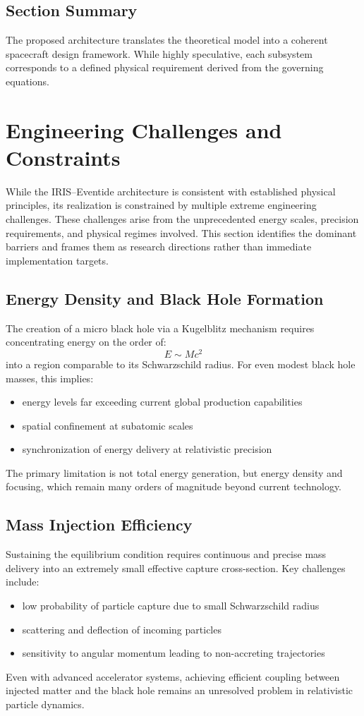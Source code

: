 \documentclass[conference]{IEEEtran}
\begin{document}
\subsection{Section Summary}
The proposed architecture translates the theoretical model into a coherent spacecraft design framework. While highly speculative, each subsystem corresponds to a defined physical requirement derived from the governing equations.
\section{Engineering Challenges and Constraints}
While the IRIS–Eventide architecture is consistent with established physical principles, its realization is constrained by multiple extreme engineering challenges. These challenges arise from the unprecedented energy scales, precision requirements, and physical regimes involved. This section identifies the dominant barriers and frames them as research directions rather than immediate implementation targets.
\subsection{Energy Density and Black Hole Formation}
The creation of a micro black hole via a Kugelblitz mechanism requires concentrating energy on the order of:
\begin{equation}
E\sim Mc^2
\end{equation}
into a region comparable to its Schwarzschild radius. For even modest black hole masses, this implies:
\begin{itemize}
\item energy levels far exceeding current global production capabilities
\item spatial confinement at subatomic scales
\item synchronization of energy delivery at relativistic precision
\end{itemize}
The primary limitation is not total energy generation, but energy density and focusing, which remain many orders of magnitude beyond current technology.
\subsection{Mass Injection Efficiency}
Sustaining the equilibrium condition requires continuous and precise mass delivery into an extremely small effective capture cross-section. Key challenges include:
\begin{itemize}
\item low probability of particle capture due to small Schwarzschild radius
\item scattering and deflection of incoming particles
\item sensitivity to angular momentum leading to non-accreting trajectories
\end{itemize}
Even with advanced accelerator systems, achieving efficient coupling between injected matter and the black hole remains an unresolved problem in relativistic particle dynamics.
\end{document}
